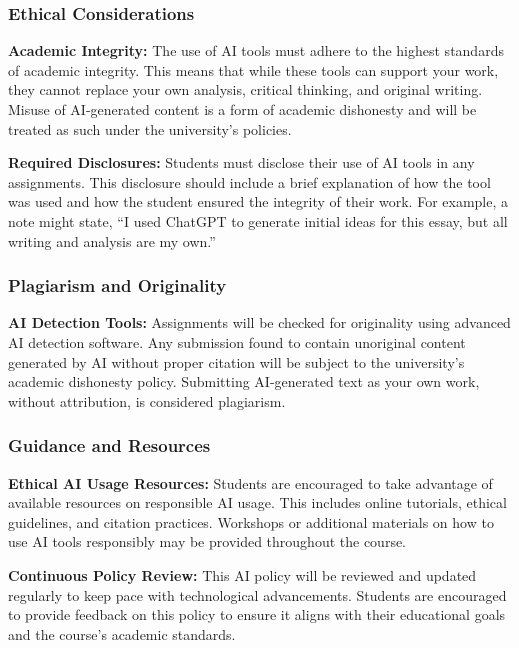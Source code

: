 \documentclass[11pt, letterpaper]{article}
\begin{document}
\subsubsection*{Ethical Considerations}
\textbf{Academic Integrity:} The use of AI tools must adhere to the highest standards of academic integrity. This means that while these tools can support your work, they cannot replace your own analysis, critical thinking, and original writing. Misuse of AI-generated content is a form of academic dishonesty and will be treated as such under the university's policies.

\vspace{1ex}

\noindent\textbf{Required Disclosures:} Students must disclose their use of AI tools in any assignments. This disclosure should include a brief explanation of how the tool was used and how the student ensured the integrity of their work. For example, a note might state, “I used ChatGPT to generate initial ideas for this essay, but all writing and analysis are my own.”

\subsubsection*{Plagiarism and Originality}
\textbf{AI Detection Tools:} Assignments will be checked for originality using advanced AI detection software. Any submission found to contain unoriginal content generated by AI without proper citation will be subject to the university's academic dishonesty policy. Submitting AI-generated text as your own work, without attribution, is considered plagiarism.

\vspace{1ex}

\subsubsection*{Guidance and Resources}
\textbf{Ethical AI Usage Resources:} Students are encouraged to take advantage of available resources on responsible AI usage. This includes online tutorials, ethical guidelines, and citation practices. Workshops or additional materials on how to use AI tools responsibly may be provided throughout the course.

\vspace{1ex}

\noindent\textbf{Continuous Policy Review:} This AI policy will be reviewed and updated regularly to keep pace with technological advancements. Students are encouraged to provide feedback on this policy to ensure it aligns with their educational goals and the course's academic standards.
\end{document}
